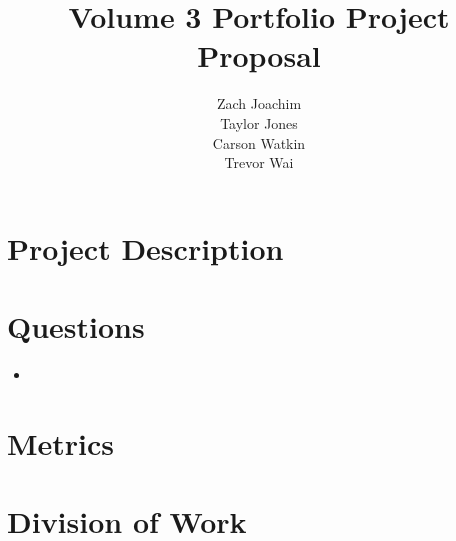 \documentclass[12pt]{article}
\title{Volume 3 Portfolio Project Proposal}
\author{Zach Joachim\\Taylor Jones\\Carson Watkin\\Trevor Wai}
\begin{document}
\maketitle

\section{Project Description}

\section{Questions}

\begin{itemize}
    \item 
\end{itemize}

\section{Metrics}

\section{Division of Work}
\end{document}
